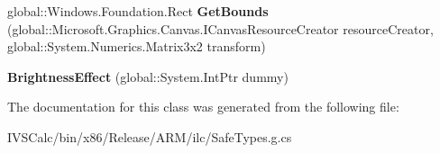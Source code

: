 \begin{DoxyCompactItemize}
\mbox{\label{class_microsoft_1_1_graphics_1_1_canvas_1_1_effects_1_1_brightness_effect_a2ff8861d383cf6930766e1f6da167f7d}} 
global\+::\+Windows.\+Foundation.\+Rect {\bfseries Get\+Bounds} (global\+::\+Microsoft.\+Graphics.\+Canvas.\+I\+Canvas\+Resource\+Creator resource\+Creator, global\+::\+System.\+Numerics.\+Matrix3x2 transform)
\item 
\mbox{\label{class_microsoft_1_1_graphics_1_1_canvas_1_1_effects_1_1_brightness_effect_a3e6e5d15295d036a491135b47f360da7}} 
{\bfseries Brightness\+Effect} (global\+::\+System.\+Int\+Ptr dummy)
\end{DoxyCompactItemize}


The documentation for this class was generated from the following file\+:\begin{DoxyCompactItemize}
\item 
I\+V\+S\+Calc/bin/x86/\+Release/\+A\+R\+M/ilc/Safe\+Types.\+g.\+cs\end{DoxyCompactItemize}
